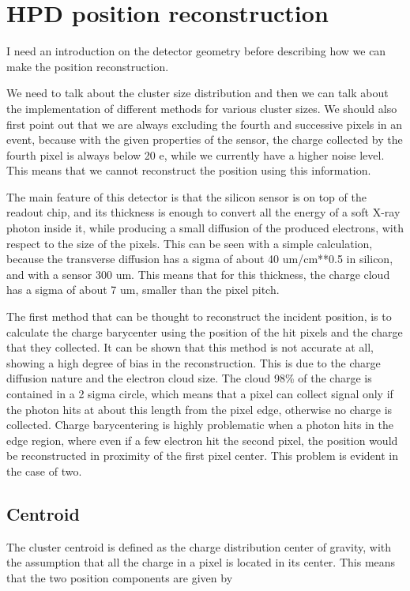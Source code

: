 \chapter{HPD position reconstruction}
\label{chap:recon}

I need an introduction on the detector geometry before describing how we can make the position reconstruction.

We need to talk about the cluster size distribution and then we can talk about the implementation of different methods for various cluster sizes. We should also first point out that we are always excluding the fourth and successive pixels in an event, because with the given properties of the sensor, the charge collected by the fourth pixel is always below 20 e, while we currently have a higher noise level. This means that we cannot reconstruct the position using this information. 


The main feature of this detector is that the silicon sensor is on top of the readout chip, and its thickness is enough to convert all the energy of a soft X-ray photon inside it, while producing a small diffusion of the produced electrons, with respect to the size of the pixels. This can be seen with a simple calculation, because the transverse diffusion has a sigma of about 40 um/cm**0.5 in silicon, and with a sensor 300 um. This means that for this thickness, the charge cloud has a sigma of about 7 um, smaller than the pixel pitch.

The first method that can be thought to reconstruct the incident position, is to calculate the charge barycenter using the position of the hit pixels and the charge that they collected. It can be shown that this method is not accurate at all, showing a high degree of bias in the reconstruction. This is due to the charge diffusion nature and the electron cloud size. The cloud 98\% of the charge is contained in a 2 sigma circle, which means that a pixel can collect signal only if the photon hits at about this length from the pixel edge, otherwise no charge is collected. Charge barycentering is highly problematic when a photon hits in the edge region, where even if a few electron hit the second pixel, the position would be reconstructed in proximity of the first pixel center. This problem is evident in the case of two.



\section{Centroid}
The cluster centroid is defined as the charge distribution center of gravity, with the assumption that all the charge in a pixel is located in its center. This means that the two position components are given by

